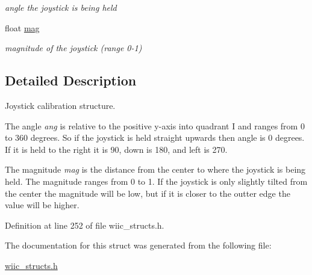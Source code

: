 \begin{DoxyCompactItemize}
\begin{DoxyCompactList}\small\item\em angle the joystick is being held \end{DoxyCompactList}\item 
\hypertarget{structjoystick__t_af358a1cfed3d18c4ce62fb62632b56cf}{float \hyperlink{structjoystick__t_af358a1cfed3d18c4ce62fb62632b56cf}{mag}}\label{structjoystick__t_af358a1cfed3d18c4ce62fb62632b56cf}

\begin{DoxyCompactList}\small\item\em magnitude of the joystick (range 0-\/1) \end{DoxyCompactList}\end{DoxyCompactItemize}


\subsection{\-Detailed \-Description}
\-Joystick calibration structure. 

\-The angle {\itshape ang\/} is relative to the positive y-\/axis into quadrant \-I and ranges from 0 to 360 degrees. \-So if the joystick is held straight upwards then angle is 0 degrees. \-If it is held to the right it is 90, down is 180, and left is 270.

\-The magnitude {\itshape mag\/} is the distance from the center to where the joystick is being held. \-The magnitude ranges from 0 to 1. \-If the joystick is only slightly tilted from the center the magnitude will be low, but if it is closer to the outter edge the value will be higher. 

\-Definition at line 252 of file wiic\-\_\-structs.\-h.



\-The documentation for this struct was generated from the following file\-:\begin{DoxyCompactItemize}
\item 
\hyperlink{wiic__structs_8h}{wiic\-\_\-structs.\-h}\end{DoxyCompactItemize}
